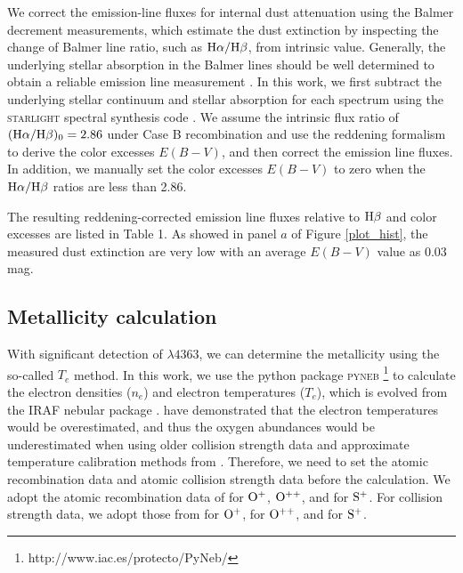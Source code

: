 \documentclass[usenatbib]{raa}
\begin{document}
We correct the emission-line fluxes for internal dust attenuation using the 
Balmer 
decrement measurements, which estimate the dust extinction by inspecting the 
change of Balmer
line ratio, such as $\hbox{H$\alpha$}/\hbox{H$\beta$}$, from intrinsic value.
Generally, the underlying stellar absorption in the Balmer lines should be well 
determined 
to obtain a reliable emission line measurement \citep{1674-4527-16-3-006}. 
 In this work, we first subtract the underlying stellar continuum 
and stellar absorption for each spectrum using the \textsc{starlight} spectral 
synthesis
code \citep{2005MNRAS.358..363C}. 
We assume the intrinsic flux ratio 
of $(\hbox{H$\alpha$}/\hbox{H$\beta$})_0=2.86$ \citep{1987MNRAS.224..801H}  under  Case B recombination 
and use the \cite{2000ApJ...533..682C}  reddening formalism to derive the color 
excesses
$E(B-V)$, and then  correct the emission line fluxes. In addition, we manually 
set the
color excesses $E(B-V)$ to zero when the $\hbox{H$\alpha$}/\hbox{H$\beta$}$ ratios are less than 2.86.
 
The resulting reddening-corrected emission line fluxes relative to $\hbox{H$\beta$}$ and 
color 
excesses are listed in Table 1. As showed in panel $a$ of Figure 
\ref{plot_hist}, 
the measured dust extinction are very low with an average $E(B-V)$ value as 
0.03 mag. 


\subsection{Metallicity calculation}

With significant detection of \oiii$\lambda4363$, we can determine the 
metallicity using 
the so-called $T_e$ method. 
In this work, we use the python package \textsc{pyneb}  
\footnote{http://www.iac.es/protecto/PyNeb/}
\citep{2015AA...573A..42L} to calculate the electron densities ($n_e$) 
and electron temperatures ($T_e$), which is evolved from the IRAF  nebular 
package
\citep{1995PASP..107..896S,1998ASPC..145..192S}.
\cite{2013ApJS..207...21N} have demonstrated that
the electron temperatures would be overestimated, and thus the oxygen
abundances would be underestimated when using older collision strength
data and approximate temperature calibration methods from  
\cite{2006AA...448..955I}.
  Therefore,
we need to set the atomic recombination data and atomic collision strength data 
before
the calculation. We adopt the atomic recombination data  of
\cite{2004ADNDT..87....1F} for $\rm O^+$, $\rm O^{++}$,  and
\cite{2010ApJS..188...32T} for $\rm S^+$. 
For collision strength data, we adopt those from 
\cite{2009MNRAS.397..903K} for $\rm O^+$,
\cite{2014MNRAS.441.3028S} for $\rm O^{++}$, and \cite{2010ApJS..188...32T} for 
$\rm S^+$.
 
\end{document}

